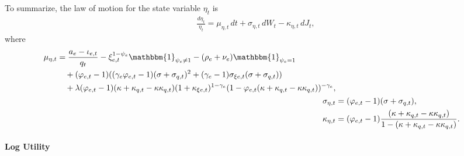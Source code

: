 \documentclass[12 pt, oneside]{article}
\theoremstyle{definition}
\theoremstyle{definition}
\theoremstyle{definition}
\begin{document}
To summarize, the law of motion for the state variable $\eta_t$ is
\begin{align}\label{eq:law of motion for eta}
\frac{d\eta_t}{\eta_t} = \mu_{\eta, t}\, dt + \sigma_{\eta, t}\, dW_t - \kappa_{\eta, t}\, dJ_t,
\end{align}
where
\begin{align}
\label{eq:drift of eta}  \begin{split}
  \mu_{\eta, t} & =  \frac{a_e - \iota_{e, t}}{q_t}- \xi_{e, t}^{1 - \psi_e}\mathbbm{1}_{\psi_e\neq 1} - (\rho_e + \nu_e)\mathbbm{1}_{\psi_e = 1} \\
              &\quad +  (\varphi_{e, t} - 1)((\gamma_e\varphi_{e, t} - 1)(\sigma + \sigma_{q, t})^2 + (\gamma_e - 1)\sigma_{\xi e, t}(\sigma + \sigma_{q, t}))\\
              &\quad + \lambda (\varphi_{e, t} - 1)(\kappa + \kappa_{q, t} - \kappa\kappa_{q, t})(1 + \kappa_{\xi e, t})^{1 - \gamma_e}(1 - \varphi_{e, t}(\kappa + \kappa_{q, t} - \kappa\kappa_{q, t}))^{ - \gamma_e},\\
  \end{split}\\
  \sigma_{\eta, t} & = (\varphi_{e, t} - 1)(\sigma + \sigma_{q, t}),\label{eq:volatility of eta}\\
  \kappa_{\eta, t} & = (\varphi_{e, t} - 1)\frac{(\kappa + \kappa_{q, t} - \kappa\kappa_{q, t})}{1 - (\kappa + \kappa_{q, t} - \kappa\kappa_{q, t})}\label{eq:jump size of eta}.
\end{align}

\paragraph{Log Utility}
\end{document}
